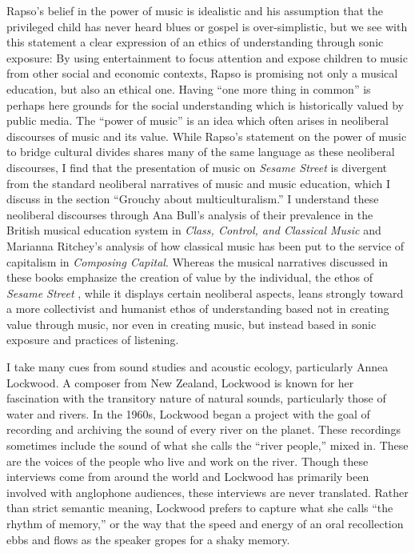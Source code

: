 \documentclass[12pt,letterpaper]{article}
\newcommand{\ses}{\textit{Sesame Street }}
\begin{document}
	Rapso's belief in the power of music is idealistic and his assumption
	that the privileged child has never heard blues or gospel is 
	over-simplistic, but we see with this statement a clear expression of
	an ethics of understanding through sonic exposure: 
	By using entertainment to focus attention and expose children to music 
	from other social and economic contexts,
	Rapso is promising not only a musical education, but also an ethical 
	one. Having ``one more thing in common'' is perhaps here grounds for 
	the social understanding which is historically valued by public media.  
	The ``power of music'' is an idea which often arises in neoliberal 
	discourses of music and its value. While Rapso's statement on the power
	of music to bridge cultural divides shares many of the same language
	as these neoliberal  discourses, I find that the presentation of music
	on \textit{Sesame Street} is divergent from the standard neoliberal
	narratives of music and music education, which I discuss in the section
	``Grouchy about multiculturalism.'' I understand these neoliberal
	discourses through
	Ana Bull's analysis of their prevalence in the British musical
	education system in \textit{Class, Control, and Classical Music} and
	Marianna Ritchey's analysis of how classical music has been put to the
	service of capitalism in \textit{Composing Capital}. Whereas the musical
	narratives discussed in these books emphasize the creation of 
	value by the individual, the ethos of \ses, while it displays certain
	neoliberal aspects, leans strongly toward a more collectivist and 
	humanist ethos of understanding based not in creating value through
	music, nor even in creating music, but instead 
	based in sonic exposure and practices of listening.  

	I take many cues from sound studies and acoustic ecology, particularly 
	Annea Lockwood. A composer from New Zealand, Lockwood is known for her 
	fascination with the transitory nature of natural sounds, particularly 
	those of water and rivers. In the 1960s, Lockwood began a project with
	the goal of recording and archiving the sound of every river on the 
	planet.\autocite[117]{Rodgers} These recordings sometimes include the 
	sound of what she calls the ``river people,'' mixed in. These are the 	
	voices of the people who live and work on the 
	river.\autocite[121]{Rodgers} Though these interviews come from around 	
	the world and Lockwood has primarily been involved with anglophone 
	audiences, these interviews are never translated. Rather than strict 
	semantic meaning, Lockwood prefers to capture what she calls ``the 
	rhythm of memory,'' or the way that the speed and energy of an oral 
	recollection ebbs and flows as the speaker gropes for a shaky 
	memory.\autocite[122]{Rodgers}  
\end{document}
